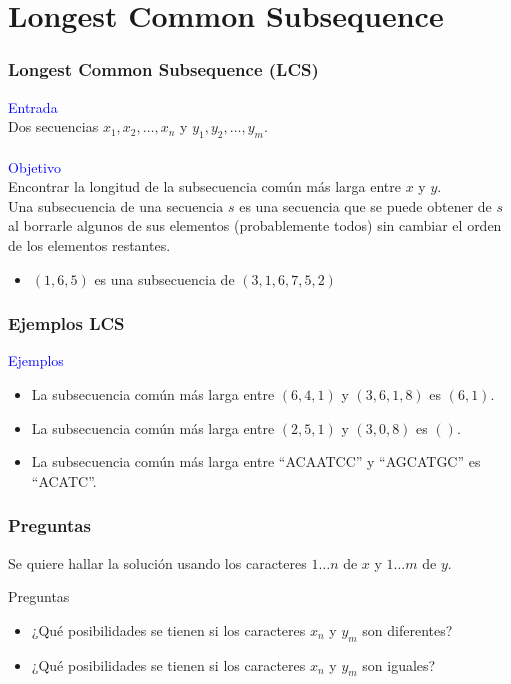 \documentclass{beamer}
\begin{document}
\section{Longest Common Subsequence}

	\begin{frame}
		\frametitle{Longest Common Subsequence (LCS)}
		\textcolor{blue}{\large Entrada}\\
		Dos secuencias $x_1, x_2, \ldots, x_n$ y $y_1, y_2, \ldots, y_m$.\\ \quad \\
		\textcolor{blue}{\large Objetivo}\\
		Encontrar la longitud de la subsecuencia común más larga entre $x$ y $y$.\\
		Una subsecuencia de una secuencia $s$ es una secuencia que se puede obtener de $s$ al borrarle algunos de sus elementos (probablemente todos) sin cambiar el orden de los elementos restantes.\\ 
		\begin{itemize}
			\item $(1, 6, 5)$ es una subsecuencia de $(3, 1, 6, 7, 5, 2)$
		\end{itemize}
	\end{frame}
	
	\begin{frame}
		\frametitle{Ejemplos LCS}
		\textcolor{blue}{\large Ejemplos}\\
		\begin{itemize}
			\item La subsecuencia común más larga entre $(6, 4, 1)$ y $(3, 6, 1, 8)$ es $(6, 1)$.
			\item La subsecuencia común más larga entre $(2, 5, 1)$ y $(3, 0, 8)$ es $()$.
			\item La subsecuencia común más larga entre ``ACAATCC'' y ``AGCATGC'' es ``ACATC''.
		\end{itemize}
	\end{frame}

	\begin{frame}
		\frametitle{Preguntas}
		Se quiere hallar la solución usando los caracteres $1 \ldots n$ de $x$ y $1 \ldots m$ de $y$.
		\begin{alertblock}{Preguntas}
			\begin{itemize}
				\item ¿Qué posibilidades se tienen si los caracteres $x_n$ y $y_m$ son diferentes?
				\item ¿Qué posibilidades se tienen si los caracteres $x_n$ y $y_m$ son iguales?
			\end{itemize}
		\end{alertblock}
	\end{frame}
	
\end{document}

